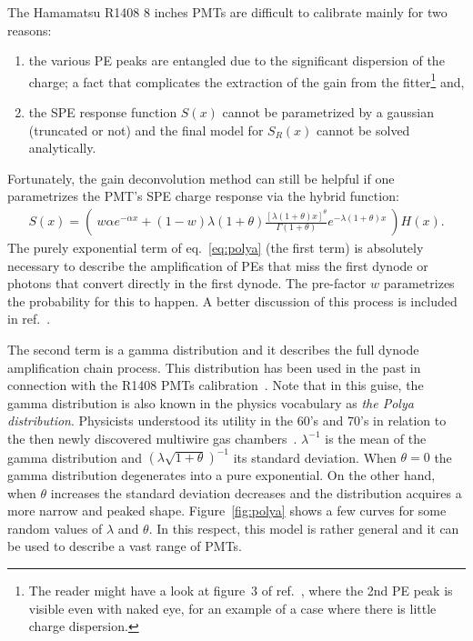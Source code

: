 \documentclass[a4paper,11pt]{article}
\begin{document}
The Hamamatsu R1408 8 inches PMTs are difficult to calibrate mainly for two reasons: 
\begin{enumerate}[label=\roman*.]
\item the various PE peaks are entangled due to the significant dispersion of the charge; 
a fact that complicates the extraction of the gain from the fitter\footnote{%
The reader might have a look at figure~3 of ref.~\cite{Bellamy}, where the 2nd PE peak is visible even with naked eye, for an example of a case where there is little charge dispersion.} and, 
\item the SPE response function $S(x)$ cannot be parametrized by a gaussian (truncated or not) and the final model for $S_R(x)$ cannot be solved analytically.    
\end{enumerate}
Fortunately, the gain deconvolution method can still be helpful if one parametrizes the PMT's SPE charge response via the hybrid function:
\begin{align}
S(x) =    \left( \ w \alpha e^{-\alpha x }  +  ( 1 - w ) \lambda (1+ \theta ) \frac{[ \lambda (1+ \theta ) x ]^\theta }{\Gamma (1+\theta) } e^{ - \lambda (1+ \theta ) x } \ \right) H( x ).
\label{eq:polya}
\end{align}
The purely exponential term of eq.~\eqref{eq:polya} (the first term) is absolutely necessary to describe the amplification of PEs that miss the first dynode or photons that convert directly in the first dynode. 
The pre-factor $w$ parametrizes the probability for this to happen. A better discussion of this process is included in ref.~\cite{Smirnov}. 

The second term is a gamma distribution and it describes the full dynode amplification chain process. 
This distribution has been used in the past in connection with the R1408 PMTs calibration~\cite{Me}. 
Note that in this guise, the gamma distribution is also known in the physics vocabulary as \emph{the Polya distribution}. 
Physicists understood its utility in the 60's and 70's in relation to the then newly discovered multiwire gas chambers~\cite{wire}.
$\lambda^{-1}$ is the mean of the gamma distribution and $( \lambda\sqrt{1+\theta} )^{-1}$ its standard deviation. 
When $\theta=0$ the gamma distribution degenerates into a pure exponential. 
On the other hand, when $\theta$ increases the standard deviation decreases and the distribution acquires a more narrow and peaked shape. 
Figure~\ref{fig:polya} shows a few curves for some random values of $\lambda$ and $\theta$. 
In this respect, this model is rather general and it can be used to describe a vast range of PMTs. 
\end{document}
